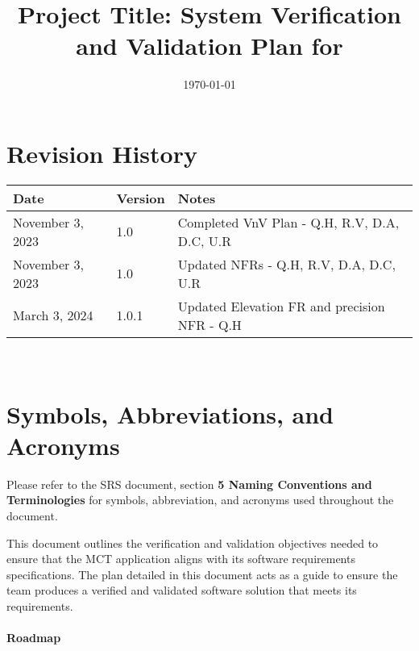 \documentclass[12pt, titlepage]{article}
\begin{document}
\title{Project Title: System Verification and Validation Plan for \progname{}} 
\author{\authname}
\date{\today}
	
\maketitle


\section*{Revision History}

\begin{tabularx}{\textwidth}{p{3cm}p{2cm}X}
\toprule {\bf Date} & {\bf Version} & {\bf Notes}\\
\midrule
November 3, 2023 & 1.0 & Completed VnV Plan - Q.H, R.V, D.A, D.C, U.R\\

November 3, 2023 & 1.0 & Updated NFRs - Q.H, R.V, D.A, D.C, U.R\\
March 3, 2024 & 1.0.1 & Updated Elevation FR and precision NFR - Q.H\\

\bottomrule
\end{tabularx}

~\\

\newpage

\tableofcontents

\newpage

\section{Symbols, Abbreviations, and Acronyms}

Please refer to the SRS document, section \textbf{5 Naming Conventions and Terminologies} for symbols, abbreviation, and acronyms used throughout the document.

\newpage



This document outlines the verification and validation objectives needed to ensure that the MCT application aligns with its software requirements specifications. The plan detailed in this document acts as a guide to ensure the team produces a verified and validated software solution that meets its requirements. 
\\\\
\textbf{Roadmap}
\end{document}
